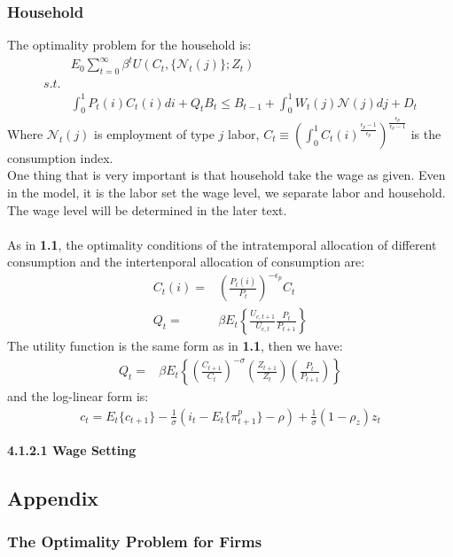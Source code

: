 \documentclass{article}
\numberwithin{equation}{section}
\begin{document}
\subsubsection{Household}
The optimality problem for the household is:
	\begin{align*}
		&E_0 \sum\limits^\infty_{t=0} \beta^t U(C_t, \{ \mathscr{N}_t(j) \}; Z_t)\\
		s.t.&\\
		&\int^1_0 P_t(i)C_t(i) di + Q_tB_t \leq B_{t-1} + \int^1_0 W_t(j)\mathscr{N}(j) dj + D_t
	\end{align*}
Where $\mathscr{N}_t(j)$ is employment of type $j$ labor, $C_t \equiv \left( \int^1_0 C_t(i)^{\frac{\epsilon_p - 1}{\epsilon_p}} \right)^{\frac{\epsilon_p}{\epsilon_p-1}}$ is the consumption index.\\
One thing that is very important is that household take the wage as given. Even in the model, it is the labor set the wage level, we separate labor and household. The wage level will be determined in the later text.\\\\
As in \textbf{1.1}, the optimality conditions of the intratemporal allocation of different consumption and the intertenporal allocation of consumption are:
	\begin{align}
		C_t(i) = &\left( \frac{P_t(i)}{P_t} \right)^{-\epsilon_p} C_t \label{4.1.2-1}\\
		Q_t = &\beta E_t \left\{ \frac{U_{c,t+1}}{U_{c,t}} \frac{P_t}{P_{t+1}} \right\} \label{4.1.2-2}
	\end{align}
The utility function is the same form as in \textbf{1.1}, then we have:
	\begin{align*}
		Q_t = &\beta E_t \left\{ \left( \frac{C_{t+1}}{C_t} \right)^{-\sigma} \left( \frac{Z_{t+1}}{Z_t} \right) \left( \frac{P_t}{P_{t+1}} \right) \right\} \label{4.1.2-2}
	\end{align*}
and the log-linear form is:
	\begin{align}
		c_t = E_t\{ c_{t+1} \} - \frac{1}{\sigma}(i_t - E_t\{ \pi^p_{t+1} \} - \rho) + \frac{1}{\sigma}(1 - \rho_z)z_t \label{4.1.2-3}
	\end{align}

\centerline{\textbf{4.1.2.1 Wage Setting}}



\newpage
\subsection{Appendix}
\subsubsection{The Optimality Problem for Firms}
\end{document}
